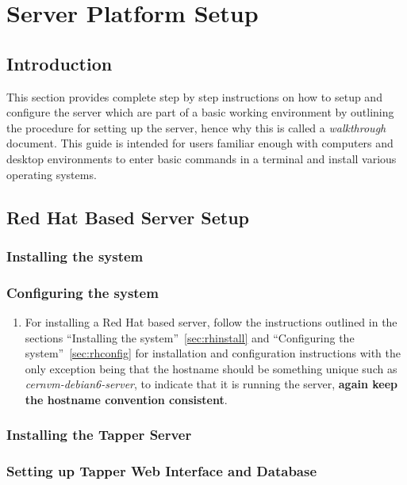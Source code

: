 \chapter{\cernvmreleasetesting Server Platform Setup}
\label{sec:serversetup}

\section{Introduction}
This section provides complete step by step instructions on how to setup and configure the \tapper server which are part of a basic working
\releasetesting environment by outlining the procedure for setting up the server, hence why this is called a \emph{walkthrough} document. 
This guide is intended for users familiar enough with computers and desktop environments to enter basic commands in a terminal and install 
various operating systems. 

\section{Red Hat Based Server Setup}
\subsection{Installing the system}
\subsection{Configuring the system}
\flushleft
\begin{enumerate}
\item 	For installing a Red Hat based server, follow the instructions outlined in the sections ``Installing the 
		system''~\ref{sec:rhinstall} and ``Configuring the system''~\ref{sec:rhconfig} for installation and configuration 
		instructions with the only exception being that the hostname should be something unique such as \emph{cernvm-debian6-server}, to 
		indicate that it is running the \tapper server, {\bf again keep the hostname convention consistent}.
\end{enumerate}

\subsection{Installing the Tapper Server}
\subsection{Setting up Tapper Web Interface and Database}


